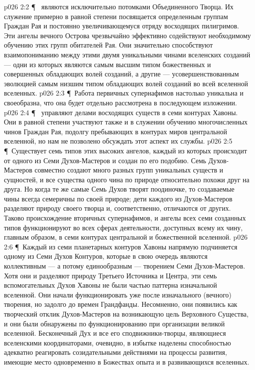 \vs p026 2:2 \P\  являются исключительно потомками Объединенного Творца. Их служение примерно в равной степени посвящается определенным группам Граждан Рая и постоянно увеличивающемуся отряду восходящих пилигримов. Эти ангелы вечного Острова чрезвычайно эффективно содействуют необходимому обучению этих групп обитателей Рая. Они значительно способствуют взаимопониманию между этими двумя уникальными чинами вселенских созданий --- одни из которых являются самым высшим типом божественных и совершенных обладающих волей созданий, а другие --- усовершенствованным эволюцией самым низшим типом обладающих волей созданий во всей вселенной вселенных.
\vs p026 2:3 \P\ Работа первичных супернафимов настолько уникальна и своеобразна, что она будет отдельно рассмотрена в последующем изложении.
\vs p026 2:4 \P\  управляют делами восходящих существ в семи контурах Хавоны. Они в равной степени участвуют также и в служении обучению многочисленных чинов Граждан Рая, подолгу пребывающих в контурах миров центральной вселенной, но нам не позволено обсуждать этот аспект их службы.
\vs p026 2:5 \P\ Существует семь типов этих высоких ангелов, каждый из которых происходит от одного из Семи Духов\hyp{}Мастеров и создан по его подобию. Семь Духов\hyp{}Мастеров совместно создают много разных групп уникальных существ и сущностей, и все существа одного чина по природе относительно похожи друг на друга. Но когда те же самые Семь Духов творят поодиночке, то создаваемые чины всегда семеричны по своей природе; дети каждого из Духов\hyp{}Мастеров разделяют природу своего творца и, соответственно, отличаются от других. Таково происхождение вторичных супернафимов, и ангелы всех семи созданных типов функционируют во всех сферах деятельности, доступных всему их чину, главным образом, в семи контурах центральной и божественной вселенной.
\vs p026 2:6 \P\ Каждый из семи планетарных контуров Хавоны напрямую подчиняется одному из Семи Духов Контуров, которые в свою очередь являются коллективным --- а потому единообразным --- творением Семи Духов\hyp{}Мастеров. Хотя они и разделяют природу Третьего Источника и Центра, эти семь вспомогательных Духов Хавоны не были частью паттерна изначальной вселенной. Они начали функционировать уже после изначального (вечного) творения, но задолго до времен Грандфанды. Несомненно, они появились как творческий отклик Духов\hyp{}Мастеров на возникающую цель Верховного Существа, и они были обнаружены по функционированию при организации великой вселенной. Бесконечный Дух и все его сподвижники\hyp{}творцы, являющиеся вселенскими координаторами, очевидно, в избытке наделены способностью адекватно реагировать созидательными действиями на процессы развития, имеющие место одновременно в Божествах опыта и в развивающихся вселенных.
